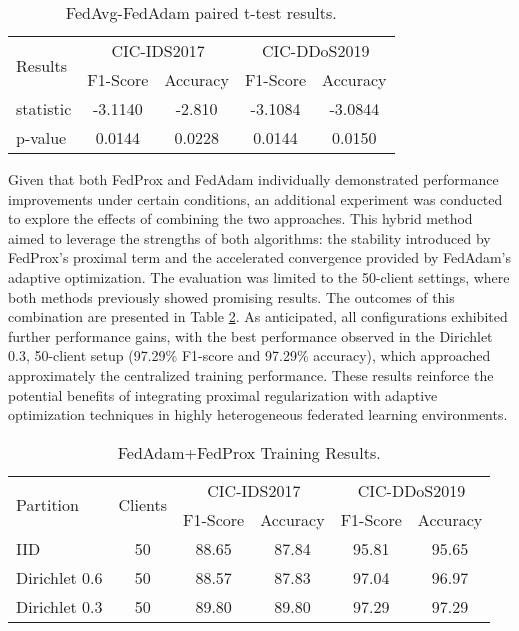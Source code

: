 \begin{table}[h]
    \caption{FedAvg-FedAdam paired t-test results.}
    \centering
    \begin{tabular}{l|c|c|c|c}
        \multirow{2}{*}{Results} & \multicolumn{2}{|c|}{CIC-IDS2017} & \multicolumn{2}{|c}{CIC-DDoS2019} \\
        \cline{2-5} & F1-Score & Accuracy & F1-Score & Accuracy \\
        \hline\hline
        statistic & -3.1140 & -2.810 & -3.1084 & -3.0844 \\
        p-value & 0.0144 & 0.0228 & 0.0144 & 0.0150 \\
    \end{tabular}
    \label{tbl:fedavg_fedadam_compare}
\end{table}

Given that both FedProx and FedAdam individually demonstrated performance improvements under certain conditions, an additional experiment was conducted to explore the effects of combining the two approaches. This hybrid method aimed to leverage the strengths of both algorithms: the stability introduced by FedProx's proximal term and the accelerated convergence provided by FedAdam's adaptive optimization. The evaluation was limited to the 50-client settings, where both methods previously showed promising results. The outcomes of this combination are presented in Table \ref{tbl:fedadam_fedprox_results}. As anticipated, all configurations exhibited further performance gains, with the best performance observed in the Dirichlet 0.3, 50-client setup (97.29\% F1-score and 97.29\% accuracy), which approached approximately the centralized training performance. These results reinforce the potential benefits of integrating proximal regularization with adaptive optimization techniques in highly heterogeneous federated learning environments.

\begin{table}[h]
    \caption{FedAdam+FedProx Training Results.}
    \centering
    \begin{tabular}{l|c|c|c|c|c}
        \multirow{2}{*}{Partition} & \multirow{2}{*}{Clients} & \multicolumn{2}{|c|}{CIC-IDS2017} & \multicolumn{2}{|c}{CIC-DDoS2019} \\
        \cline{3-6} & & F1-Score & Accuracy & F1-Score & Accuracy \\
        \hline\hline
        IID & 50 & 88.65 & 87.84 & 95.81 & 95.65 \\
        Dirichlet 0.6 & 50 & 88.57 & 87.83 & 97.04 & 96.97 \\
        Dirichlet 0.3 & 50 & 89.80 & 89.80 & 97.29 & 97.29 \\
    \end{tabular}
    \label{tbl:fedadam_fedprox_results}
\end{table}
